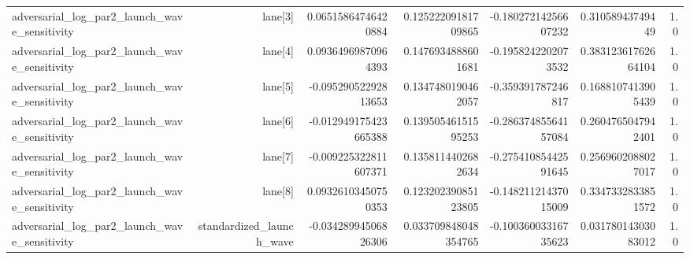{\begin{longtable}{lrrrrrr}
adversarial\_log\_par2\_launch\_wave\_sensitivity & lane[3] & 0.06515864746420884 & 0.12522209181709865 & -0.18027214256607232 & 0.31058943749449 & 1.0 \\
adversarial\_log\_par2\_launch\_wave\_sensitivity & lane[4] & 0.09364969870964393 & 0.1476934888601681 & -0.1958242202073532 & 0.38312361762664104 & 1.0 \\
adversarial\_log\_par2\_launch\_wave\_sensitivity & lane[5] & -0.09529052292813653 & 0.1347480190462057 & -0.359391787246817 & 0.1688107413905439 & 1.0 \\
adversarial\_log\_par2\_launch\_wave\_sensitivity & lane[6] & -0.012949175423665388 & 0.13950546151595253 & -0.28637485564157084 & 0.2604765047942401 & 1.0 \\
adversarial\_log\_par2\_launch\_wave\_sensitivity & lane[7] & -0.009225322811607371 & 0.1358114402682634 & -0.27541085442591645 & 0.2569602088027017 & 1.0 \\
adversarial\_log\_par2\_launch\_wave\_sensitivity & lane[8] & 0.09326103450750353 & 0.12320239085123805 & -0.14821121437015009 & 0.3347332833851572 & 1.0 \\
adversarial\_log\_par2\_launch\_wave\_sensitivity & standardized\_launch\_wave & -0.03428994506826306 & 0.033709848048354765 & -0.10036003316735623 & 0.03178014303083012 & 1.0 \\
\bottomrule
\end{longtable}
}
